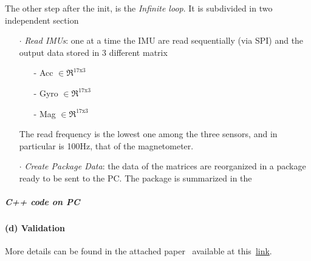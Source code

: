 The other step after the init, is the \textit{Infinite loop}. It is subdivided in two independent section
\begin{enumerate}
\item[$\cdot$] \textit{Read IMUs}: one at a time the IMU are read sequentially (via SPI) and the output data stored in 3 different matrix
                          \begin{enumerate}
                          \item[-] Acc $\in \Re ^{17 \text{x} 3}$
                          \item[-] Gyro $\in \Re ^{17 \text{x} 3}$
                          \item[-] Mag $\in \Re ^{17 \text{x} 3}$
                          \end{enumerate}
                           The read frequency is the lowest one among the three sensors, and in particular is 100Hz, that of the magnetometer.
\item[$\cdot$] \textit{Create Package Data}:  the data of the matrices are reorganized in a package ready to be sent to the PC. The package  is summarized in the  
\end{enumerate} 
 
\subparagraph{C++ code on PC}




\paragraph{(d) Validation}

More details can be found in the attached paper~\cite{Santaera:ICRA:2015} available at this~\href{./attachedPapers/ReconstructionPosturesImuMeasurements.pdf}{link}.
